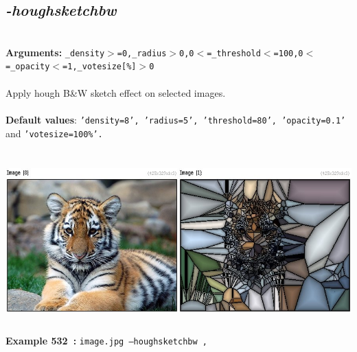 \documentclass[a4paper,11pt,twoside]{book}
\begin{document}
\subsection{\emph{-houghsketchbw} }\vspace*{-0.5em}
~\\\textbf{Arguments: } 
{\small \texttt{\_density$>$=0,\_radius$>$0,0$<$=\_threshold$<$=100,0$<$=\_opacity$<$=1,\_votesize[\%]$>$0}}\\~\\
Apply hough B\&W sketch effect on selected images.
~\\~\\\textbf{Default values}: {\small \texttt{'density=8', 'radius=5', 'threshold=80', 'opacity=0.1'} and \texttt{'votesize=100\%'.}}
\begin{center}\includegraphics[keepaspectratio=true,height=7cm,width=\textwidth]{img/gmic_def532.jpg}\\
{\footnotesize \textbf{Example 532~:} \texttt{image.jpg --houghsketchbw ,}}
\end{center}
\end{document}
